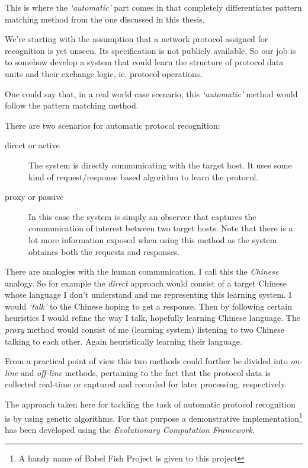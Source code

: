 \documentclass[times, utf8, diplomski]{fer}
\begin{document}
This is where the \emph{`automatic'} part comes in that completely differentiates
pattern matching method from the one discussed in this thesis.

We're starting with the assumption that a network protocol assigned for recognition
is yet unseen. Its specification is not publicly available. So our job is to somehow 
develop a system that could learn the structure of protocol data units and their 
exchange logic, ie. protocol operations.

One could say that, in a real world case scenario, this \emph{`automatic'} method 
would follow the pattern matching method.

There are two scenarios for automatic protocol recognition:
\begin{description}
	\item[direct or active] The system is directly communicating with the target 
		host. It uses some kind of request/response based algorithm to learn the 
		protocol.
	\item[proxy or passive] In this case the system is simply an observer that
		captures the communication of interest between two target hosts. Note that
		there is a lot more information exposed when using this method as the system
		obtaines both the requests and responses.
\end{description}

There are analogies with the human communication. I call this the \emph{Chinese} 
analogy. So for example the \emph{direct} approach would consist of a target Chinese
whose language I don't understand and me representing this learning system. I would
\emph{`talk'} to the Chinese hoping to get a response. Then by following certain
heuristics I would refine the way I talk, hopefully learning Chinese language.
The \emph{proxy} method would consist of me (learning system) listening to two
Chinese talking to each other. Again heuristically learning their language.

From a practical point of view this two methods could further be divided into 
\emph{on-line} and \emph{off-line} methods, pertaining to the fact that the protocol
data is collected real-time or captured and recorded for later processing, respectively.

The approach taken here for tackling the task of automatic protocol recognition
is by using genetic algorithms. For that purpose a demonstrative implementation\footnote{
A handy name of Babel Fish Project is given to this project}
has been developed using the \emph{Evolutionary Computation Framework}.
\end{document}
